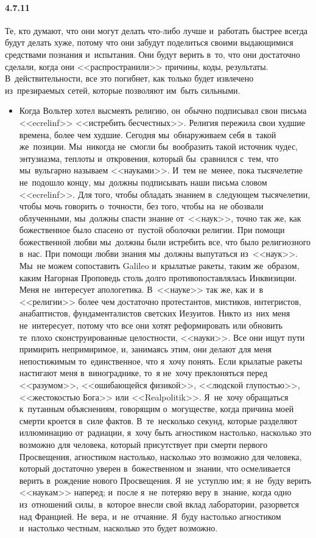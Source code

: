 \paragraph{4.7.11}\hypertarget{par:4.7.11}{}Те, кто думают, что они могут делать что-либо лучше и~работать быстрее всегда будут делать хуже, потому что они забудут поделиться своими выдающимися средствами познания и~испытания. Они будут верить в~то, что они достаточно сделали, когда они <<распространили>> причины, коды, результаты. В~действительности, все это погибнет, как только будет извлечено из~презираемых сетей, которые позволяют им~быть сильными.
	\begin{itemize}
	\item 
	Когда Вольтер хотел высмеять религию, он~обычно подписывал свои письма <<ecrelinf>> <<истребить бесчестных>>. Религия пережила свои худшие времена, более чем худшие. Сегодня мы~обнаруживаем себя в~такой же~позиции. Мы~никогда не~смогли бы~вообразить такой источник чудес, энтузиазма, теплоты и~откровения, который бы~сравнился с~тем, что мы~вульгарно называем <<науками>>. И~тем не~менее, пока тысячелетие не~подошло концу, мы~должны подписывать наши письма словом <<ecrelinf>>. Для того, чтобы обладать знанием в~следующем тысячелетии, чтобы мочь говорить о~точности, без того, чтобы на~не обозвали облученными, мы~должны спасти знание от~<<наук>>, точно так же, как божественное было спасено от~пустой оболочки религии. При помощи божественной любви мы~должны были истребить все, что было религиозного в~нас. При помощи любви знания мы~должны выпутаться из~<<наук>>. Мы~не можем сопоставить Galileo и~крылатые ракеты, таким же~образом, каким Нагорная Проповедь столь долго противопоставлялась Инквизиции. Меня не~интересует апологетика. В~<<науке>> так же, как и~в <<религии>> более чем достаточно протестантов, мистиков, интегристов, анабаптистов, фундаменталистов светских Иезуитов. Никто из~них меня не~интересует, потому что все они хотят реформировать или обновить те~плохо сконструированные целостности, <<науки>>. Все они ищут пути примирить непримиримое, и, занимаясь этим, они делают для меня непостижимым то~единственное, что я~хочу понять. Если крылатые ракеты настигают меня в~винограднике, то~я не~хочу преклоняться перед <<разумом>>, <<ошибающейся физикой>>, <<людской глупостью>>, <<жестокостью Бога>> или <<Realpolitik>>. Я~не~хочу обращаться к~путанным объяснениям, говорящим о~могуществе, когда причина моей смерти кроется в~силе фактов. В~те~несколько секунд, которые разделяют иллюминацию от~радиации, я~хочу быть агностиком настолько, насколько это возможно для человека, который присутствует при смерти первого Просвещения, агностиком настолько, насколько это возможно для человека, который достаточно уверен в~божественном и~знании, что осмеливается верить в~рождение нового Просвещения. Я~не~уступлю им; я~не~буду верить <<наукам>> наперед; и~после я~не~потеряю веру в~знание, когда одно из~отношений силы, в~которое внесли свой вклад лаборатории, разорвется над Францией. Не~вера, и~не~отчаяние. Я~буду настолько агностиком и~настолько честным, насколько это будет возможно.
	\end{itemize}